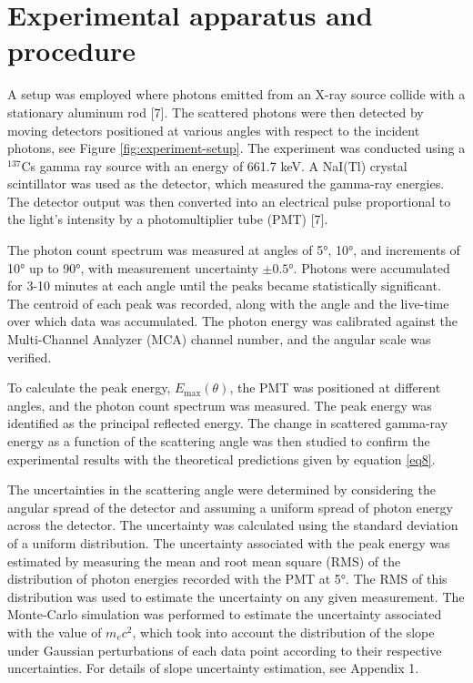 

\section{Experimental apparatus and procedure}

A setup was employed where photons emitted from an X-ray source collide with a stationary aluminum rod [7]. The scattered photons were then detected by moving detectors positioned at various angles with respect to the incident photons, see Figure \ref{fig:experiment-setup}. The experiment was conducted using a $^{137}$Cs gamma ray source with an energy of 661.7 keV. A NaI(Tl) crystal scintillator was used as the detector, which measured the gamma-ray energies. The detector output was then converted into an electrical pulse proportional to the light's intensity by a photomultiplier tube (PMT) [7].

The photon count spectrum was measured at angles of 5°, 10°, and increments of 10° up to 90°, with measurement uncertainty $\pm 0.5 $°. Photons were accumulated for 3-10 minutes at each angle until the peaks became statistically significant. The centroid of each peak was recorded, along with the angle and the live-time over which data was accumulated. The photon energy was calibrated against the Multi-Channel Analyzer (MCA) channel number, and the angular scale was verified.

To calculate the peak energy, $E_{\max}(\theta)$, the PMT was positioned at different angles, and the photon count spectrum was measured. The peak energy was identified as the principal reflected energy. The change in scattered gamma-ray energy as a function of the scattering angle was then studied to confirm the experimental results with the theoretical predictions given by equation \eqref{eq8}.

The uncertainties in the scattering angle were determined by considering the angular spread of the detector and assuming a uniform spread of photon energy across the detector. The uncertainty was calculated using the standard deviation of a uniform distribution. The uncertainty associated with the peak energy was estimated by measuring the mean and root mean square (RMS) of the distribution of photon energies recorded with the PMT at 5°. The RMS of this distribution was used to estimate the uncertainty on any given measurement. The Monte-Carlo simulation was performed to estimate the uncertainty associated with the value of $m_ec^2$, which took into account the distribution of the slope under Gaussian perturbations of each data point according to their respective uncertainties. For details of slope uncertainty estimation, see Appendix 1.

